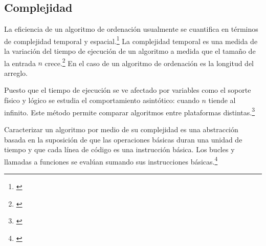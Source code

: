 \documentclass[titlepage]{article}
\begin{document}
\subsection{Complejidad} %
La eficiencia de un algoritmo de ordenación usualmente se cuantifica en términos de complejidad temporal y espacial.\footnote{\cite{molluzzo1997first}} La complejidad temporal es una medida de la variación del tiempo de ejecución de un algoritmo a medida que el tamaño de la entrada $n$ crece.\footnote{\cite{ching2023uncertainty}} En el caso de un algoritmo de ordenación es la longitud del arreglo.

Puesto que el tiempo de ejecución se ve afectado por variables como el soporte físico y lógico se estudia el comportamiento asintótico: cuando $n$ tiende al infinito. Este método permite comparar algoritmos entre plataformas distintas.\footnote{\cite{Heineman2008-mw}}

Caracterizar un algoritmo por medio de su complejidad es una abstracción basada en la suposición de que las operaciones básicas duran una unidad de tiempo y que cada línea de código es una instrucción básica. Los bucles y llamadas a funciones se evalúan sumando sus instrucciones básicas.\footnote{\cite{datacamp2024bigO}}
\end{document}
